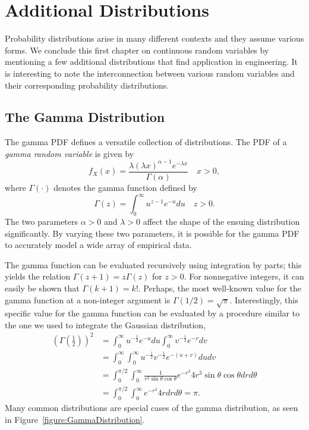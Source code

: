 \section{Additional Distributions}

Probability distributions arise in many different contexts and they assume various forms.
We conclude this first chapter on continuous random variables by mentioning a few additional distributions that find application in engineering.
It is interesting to note the interconnection between various random variables and their corresponding probability distributions.


\subsection{The Gamma Distribution}

The gamma PDF defines a versatile collection of distributions.
The PDF of a \emph{gamma random variable} is given by 
\begin{equation*}
f_X (x) = \frac{\lambda (\lambda x)^{\alpha - 1} e^{-\lambda x}}{\Gamma (\alpha)} \quad  x > 0,
\end{equation*}
where $\Gamma(\cdot)$ denotes the gamma function defined by
\begin{equation*}
\Gamma (z) = \int_0^{\infty} u^{z-1} e^{-u} du \quad z > 0 .
\end{equation*}
The two parameters $\alpha > 0$ and $\lambda > 0$ affect the shape of the ensuing distribution significantly.
By varying these two parameters, it is possible for the gamma PDF to accurately model a wide array of empirical data.

The gamma function can be evaluated recursively using integration by parts; this yields the relation $\Gamma (z+1) = z \Gamma (z)$ for $z > 0$.
For nonnegative integers, it can easily be shown that $\Gamma (k + 1) = k!$.
Perhaps, the most well-known value for the gamma function at a non-integer argument is $\Gamma ( 1/2 ) = \sqrt{\pi}$.
Interestingly, this specific value for the gamma function can be evaluated by a procedure similar to the one we used to integrate the Gaussian distribution,
\begin{equation*}
\begin{split}
\left( \Gamma \left( \frac{1}{2} \right) \right)^2
&= \int_0^{\infty} u^{-\frac{1}{2}} e^{-u} du
\int_0^{\infty} v^{-\frac{1}{2}} e^{-v} dv \\
&= \int_0^{\infty} \int_0^{\infty}
u^{-\frac{1}{2}} v^{-\frac{1}{2}} e^{-(u + v)}
du dv \\
&= \int_0^{\pi / 2} \int_0^{\infty}
\frac{1}{r^2 \sin \theta \cos \theta} e^{-r^2}
4 r^3 \sin \theta \cos \theta dr d\theta \\
&= \int_0^{\pi / 2} \int_0^{\infty}
 e^{-r^2} 4 r dr d\theta
= \pi .
\end{split}
\end{equation*}
Many common distributions are special cases of the gamma distribution, as seen in Figure~\ref{figure:GammaDistribution}.

